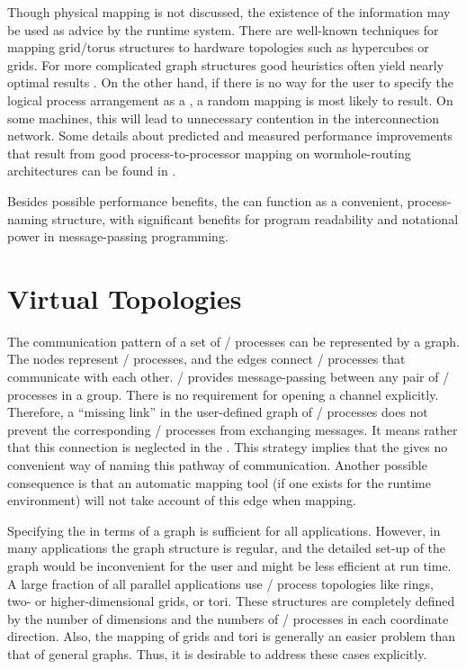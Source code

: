 \begin{rationale}
Though physical mapping is not discussed, the
existence of the  information may be used as advice by
the runtime system.
There are well-known techniques for mapping grid/torus structures to
hardware topologies such as hypercubes or grids. For more
complicated graph structures good heuristics often yield nearly optimal
results \cite{suprenum}. On the other hand,
if there is no way for the user to specify the logical process
arrangement as a , a random mapping is most
likely to result. On some machines, this will lead to
unnecessary contention in the interconnection network.
Some details about predicted and measured
performance improvements that result from good process-to-processor
mapping on wormhole-routing architectures can be found in
\cite{wormhole2,wormhole1}.

Besides possible performance benefits, the  can
function as a convenient, process-naming structure, with 
significant
benefits for program readability and notational power in
message-passing programming.
\end{rationale}

\section{Virtual Topologies}
The communication pattern of a set of \MPI/ processes can be represented by a
graph. The nodes 
represent \MPI/ processes,
and the edges connect \MPI/ processes that
communicate with each other. \MPI/ provides message-passing between any pair
of \MPI/ processes in a group. There is no requirement for opening a channel
explicitly. Therefore, a ``missing link'' in the user-defined graph of \MPI/ processes
does not prevent the corresponding \MPI/ processes from exchanging messages. It
means rather that this connection is neglected in the . This
strategy implies
that the  gives no convenient way of naming this pathway of
communication.  Another possible consequence is that an automatic mapping tool
(if one exists for the runtime environment) will not take account of this edge
when mapping.  

Specifying the 
in terms of a graph is sufficient for all applications. However, in
many applications the graph structure is regular, and the detailed set-up
of the graph would be inconvenient for the user and might be less
efficient at
run time. A large fraction of all parallel applications use \MPI/ process topologies
like rings, two- or higher-dimensional grids, or tori. These structures are
completely defined by the number of dimensions and the numbers of \MPI/ processes in
each coordinate direction.  Also, the mapping of grids and tori is generally
an easier problem than that of general graphs.  Thus, it is desirable to
address these cases explicitly.

